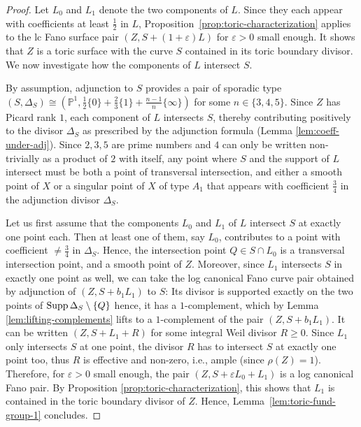 \documentclass{amsart}
\newcommand{\pp}{\mathbb{P}}
\theoremstyle{definition}
\theoremstyle{remark}
\numberwithin{equation}{section}
\begin{document}
\begin{proof}
Let $L_0$ and $L_1$ denote the two components of $L$. Since they each appear with coefficients at least $\frac{1}{2}$ in $L$, Proposition~\ref{prop:toric-characterization} applies to the lc Fano surface pair $(Z,S+(1+\varepsilon) L)$ for $\varepsilon>0$ small enough. It shows that $Z$ is a toric surface with the curve $S$ contained in its toric boundary divisor. We now investigate how the components of $L$ intersect $S$. 

By assumption, adjunction to $S$ provides a pair of sporadic type $(S,\Delta_S)\cong (\pp^1,\frac{1}{2}\{0\}+\frac{2}{3}\{1\}+\frac{n-1}{n}\{\infty\})$ for some $n\in\{3,4,5\}$.
Since $Z$ has Picard rank $1$, each component of $L$ intersects $S$, thereby contributing positively to the divisor $\Delta_S$ as prescribed by the adjunction formula (Lemma \ref{lem:coeff-under-adj}). Since $2,3,5$ are prime numbers and $4$ can only be written non-trivially as a product of $2$ with itself, any point where $S$ and the support of $L$ intersect must be both a point of transversal intersection, and either a smooth point of $X$ or a singular point of $X$ of type $A_1$ that appears with coefficient $\frac{3}{4}$ in the adjunction divisor $\Delta_S$.

\medskip

Let us first assume that the components $L_0$ and $L_1$ of $L$ intersect $S$ at exactly one point each. Then at least one of them, say $L_0$, contributes to a point with coefficient $\neq\frac{3}{4}$ in $\Delta_S$. Hence, the intersection point $Q\in S\cap L_0$ is a transversal intersection point, and a smooth point of $Z$.
Moreover, since $L_1$ intersects $S$ in exactly one point as well, we can take the log canonical Fano curve pair obtained by adjunction of $(Z,S+b_1L_1)$ to $S$: Its divisor is supported exactly on the two points of ${\rm Supp}\,\Delta_S \setminus \{Q\}$ hence, it has a $1$-complement, which by Lemma \ref{lem:lifting-complements} lifts to a $1$-complement of the pair $(Z,S+b_1L_1)$. It can be written $(Z,S+L_1+R)$ for some integral Weil divisor $R\ge 0$. Since $L_1$ only intersects $S$ at one point, the divisor $R$ has to intersect $S$ at exactly one point too, thus $R$ is effective and non-zero, i.e., ample (since $\rho(Z)=1$). Therefore, for $\varepsilon > 0$ small enough, the pair $(Z,S+\varepsilon L_0 + L_1)$ is a log canonical Fano pair. By Proposition \ref{prop:toric-characterization}, this shows that $L_1$ is contained in the toric boundary divisor of $Z$.
Hence, Lemma~\ref{lem:toric-fund-group-1} concludes.


\end{proof}
\end{document}
